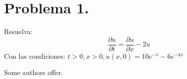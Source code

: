 \section{Problema 1.} Resuelva: $$\frac{\partial u}{\partial t}=\frac{\partial u}{\partial x}-2 u$$
Con las condiciones: $ t>0, x>0, u(x, 0)=10 e^{-x}-6 e^{-4 x}$

\begin{solution}
	Some authors offer. 
\end{solution}